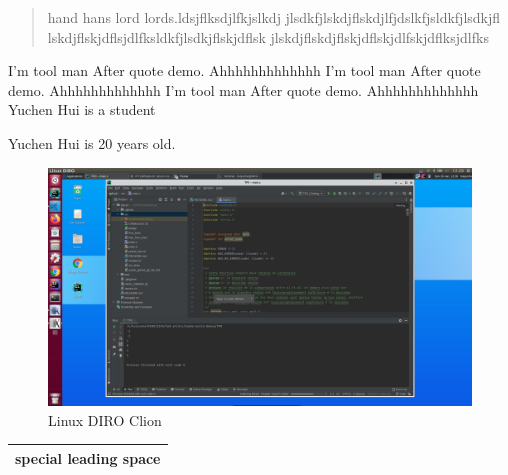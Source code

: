 \documentclass[11pt,oneside,a4paper]{article}
\begin{document}
      \begin{quote}
            hand hans lord lords.ldsjflksdjlfkjslkdj
            jlsdkfjlskdjflskdjlfjdslkfjsldkfjlsdkjfl
            lskdjflskjdflsjdlfksldkfjlsdkjflskjdflsk
            jlskdjflskdjflskjdflskjdlfskjdflksjdlfks
      \end{quote}
      I'm tool man After quote demo. Ahhhhhhhhhhhhh
      I'm tool man After quote demo. Ahhhhhhhhhhhhh
      I'm tool man After quote demo. Ahhhhhhhhhhhhh
      Yuchen Hui is a student 

      Yuchen Hui is 20 years old.\\
      \begin{figure}[h]
            \centering
            \includegraphics[scale=0.2]{linuxDirotp0.png}
            \caption{Linux DIRO Clion}
            \label{fig:linuxDIRO}
      \end{figure}
      
      \vspace{1.1em}
      \begin{tabular}[]{@{!`!`!`!`!`!`} c @{!!!!!}}
            \hline
            special leading space\footnotemark\\
            \hline
      \end{tabular}
      \newline
\end{document}
